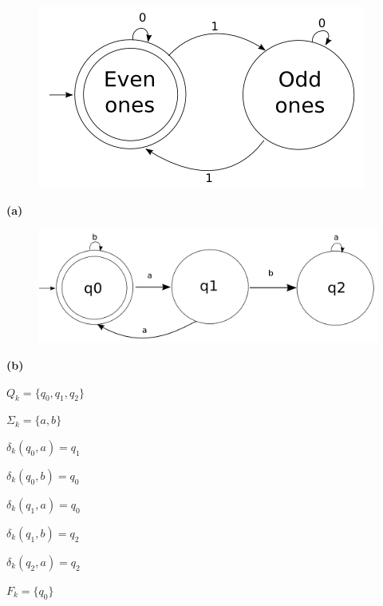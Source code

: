 \documentclass[11pt]{article}
\newcommand{\question}[2] {\vspace{.25in} \fbox{#1} #2 \vspace{.10in}}
\renewcommand{\part}[1] {\vspace{.10in} {\bf (#1)}}
\begin{document}
\question{3}{}
\begin{figure}[h!]
  \begin{center}
    \includegraphics[scale=0.40]{3.png}
  \end{center}
\end{figure}


\question{4}{}
\part{a}
\begin{figure}[h!]
  \begin{center}
    \includegraphics[scale=0.40]{4a.png}
  \end{center}
\end{figure}

\part{b}
  \begin{center}
  $Q_{k} = \{ q_{0}, q_{1}, q_{2} \} $

  ${\Sigma}_{k} = \{ a, b \} $

  ${\delta}_{k}(q_{0},a) = q_{1}$

  ${\delta}_{k}(q_{0},b) = q_{0}$

  ${\delta}_{k}(q_{1},a) = q_{0}$

  ${\delta}_{k}(q_{1},b) = q_{2}$

  ${\delta}_{k}(q_{2},a) = q_{2}$

  $F_{k} = \{ q_{0} \} $
  \end{center}
 
\end{document}
